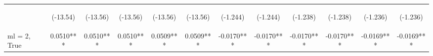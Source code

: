 \documentclass[]{article}
\begin{document}
\begin{center}
\begin{tabular}{lccccccccccc}
        \vspace{4pt}     & \begin{footnotesize}(-13.54)\end{footnotesize} & \begin{footnotesize}(-13.56)\end{footnotesize} & \begin{footnotesize}(-13.56)\end{footnotesize} & \begin{footnotesize}(-13.56)\end{footnotesize} & \begin{footnotesize}(-13.56)\end{footnotesize} & \begin{footnotesize}(-1.244)\end{footnotesize}  & \begin{footnotesize}(-1.244)\end{footnotesize}  & \begin{footnotesize}(-1.238)\end{footnotesize} & \begin{footnotesize}(-1.238)\end{footnotesize} & \begin{footnotesize}(-1.236)\end{footnotesize} & \begin{footnotesize}(-1.236)\end{footnotesize} \\
        ml = 2, True     & 0.0510***                                      & 0.0510***                                      & 0.0510***                                      & 0.0509***                                      & 0.0509***                                      & -0.0170***                                      & -0.0170***                                      & -0.0170***                                     & -0.0170***                                     & -0.0169***                                     & -0.0169***                                     \\

\end{tabular}
\end{center}
\end{document}

